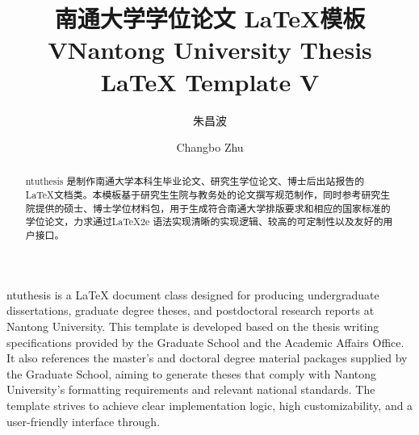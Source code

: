 \documentclass[doctor,academic]{style/ntuthesis}
\title{南通大学学位论文 \LaTeX{}模板 V\projectversion}%
\title*{Nantong University Thesis \LaTeX{} Template V\projectversion}%
\author{朱昌波}%
\author*{Changbo Zhu}%
\begin{document}
\maketitle%
\tableofcontents

\frontmatter%
\begin{abstract}    
ntuthesis 是制作南通大学本科生毕业论文、研究生学位论文、博士后出站报告的 \LaTeX{}文档类。本模板基于研究生生院与教务处的论文撰写规范制作，同时参考研究生院提供的硕士、博士学位材料包，用于生成符合南通大学排版要求和相应的国家标准的学位论文，力求通过\LaTeX{}2e 语法实现清晰的实现逻辑、较高的可定制性以及友好的用户接口。

\end{abstract}

\begin{abstract*}
ntuthesis is a \LaTeX{} document class designed for producing undergraduate dissertations, graduate degree theses, and postdoctoral research reports at Nantong University. This template is developed based on the thesis writing specifications provided by the Graduate School and the Academic Affairs Office. It also references the master's and doctoral degree material packages supplied by the Graduate School, aiming to generate theses that comply with Nantong University's formatting requirements and relevant national standards. The template strives to achieve clear implementation logic, high customizability, and a user-friendly interface through.

\end{abstract*}

\mainmatter









{
\intotoc*{\cleardoublepage}{\bibname}%
\linespread{1.25}
\ntuthesisbibliography%
}

\appendix





\cleardoublepage[plain]%
\end{document}
